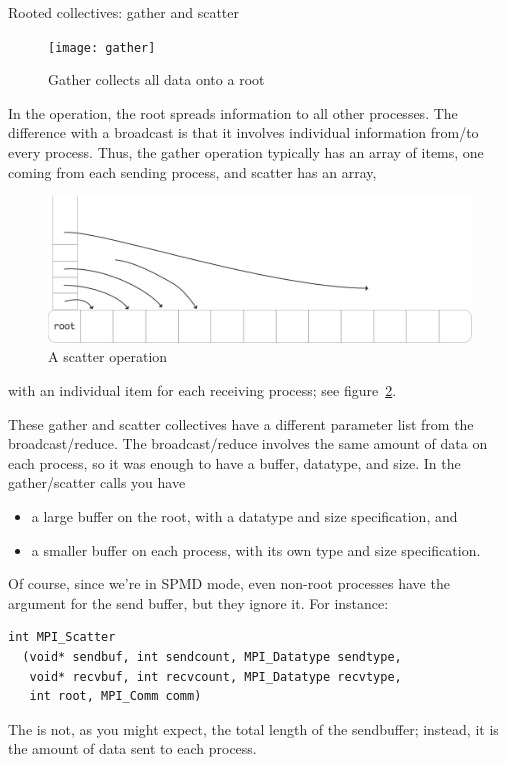 
 {Rooted collectives: gather and scatter}
\label{sec:gatherscatter}

\begin{figure}[ht]
  \texttt{[image: gather]}
  \caption{Gather collects all data onto a root}
  \label{fig:gather}
\end{figure}

In the  operation, the root spreads information to
all other processes. The difference with a broadcast is that it involves
individual information from/to every process. Thus, the gather operation typically 
has an array of items, one coming from each sending process, and scatter has an array,
\begin{figure}[ht]
  \includegraphics[scale=.12]{graphics/scatter-simple}
  \caption{A scatter operation}
  \label{fig:scatter}
\end{figure}
with an individual item for each receiving process; see figure~\ref{fig:scatter}.

These gather and scatter collectives have a different parameter list from
the broadcast/reduce. The broadcast/reduce involves the same amount
of data on each process, so it was enough to have a buffer, datatype, and size.
In the gather/scatter calls you have
\begin{itemize}
\item a large buffer on the root, with a datatype and size specification, and
\item a smaller buffer on each process, with its own type and size specification.
\end{itemize}
Of course, since we're in SPMD mode, even non-root processes have
the argument for the send buffer, but they ignore it. For instance:
\begin{lstlisting}
int MPI_Scatter
  (void* sendbuf, int sendcount, MPI_Datatype sendtype, 
   void* recvbuf, int recvcount, MPI_Datatype recvtype, 
   int root, MPI_Comm comm) 
\end{lstlisting}
The  is not, as you might expect, the total length of the
sendbuffer; instead, it is the amount of data sent to each process.

